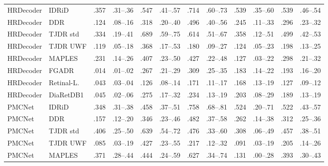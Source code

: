 \begin{landscape}
{\begin{longtable}{l l c c c c c c c c c c}
HRDecoder & IDRiD & .357 & \scriptsize .31--.36 & .547 & \scriptsize .41--.57 & .714 & \scriptsize .60--.73 & .539 & \scriptsize .35--.60 & .539 & \scriptsize .46--.54 \\
HRDecoder & DDR & .124 & \scriptsize .08--.16 & .318 & \scriptsize .20--.40 & .496 & \scriptsize .40--.56 & .245 & \scriptsize .11--.33 & .296 & \scriptsize .23--.32 \\
HRDecoder & TJDR std & .334 & \scriptsize .19--.41 & .689 & \scriptsize .59--.75 & .614 & \scriptsize .51--.67 & .358 & \scriptsize .12--.51 & .499 & \scriptsize .42--.53 \\
HRDecoder & TJDR UWF & .119 & \scriptsize .05--.18 & .368 & \scriptsize .17--.53 & .180 & \scriptsize .09--.27 & .124 & \scriptsize .05--.23 & .198 & \scriptsize .13--.25 \\
HRDecoder & MAPLES & .231 & \scriptsize .14--.26 & .407 & \scriptsize .23--.50 & .427 & \scriptsize .22--.48 & .127 & \scriptsize .03--.22 & .298 & \scriptsize .21--.32 \\
HRDecoder & FGADR & .014 & \scriptsize .01--.02 & .267 & \scriptsize .21--.29 & .309 & \scriptsize .25--.35 & .183 & \scriptsize .14--.22 & .193 & \scriptsize .16--.20 \\
HRDecoder & Retinal-L. & .043 & \scriptsize .03--.04 & .126 & \scriptsize .08--.14 & .171 & \scriptsize .11--.17 & .168 & \scriptsize .13--.19 & .127 & \scriptsize .09--.12 \\
HRDecoder & DiaRetDB1 & .045 & \scriptsize .02--.06 & .275 & \scriptsize .17--.32 & .234 & \scriptsize .13--.19 & .203 & \scriptsize .08--.29 & .189 & \scriptsize .13--.19 \\
PMCNet & IDRiD & .348 & \scriptsize .31--.38 & .458 & \scriptsize .37--.51 & .758 & \scriptsize .68--.81 & .524 & \scriptsize .20--.71 & .522 & \scriptsize .43--.57 \\
PMCNet & DDR & .157 & \scriptsize .12--.20 & .346 & \scriptsize .23--.46 & .482 & \scriptsize .37--.58 & .262 & \scriptsize .14--.38 & .312 & \scriptsize .25--.36 \\
PMCNet & TJDR std & .406 & \scriptsize .25--.50 & .639 & \scriptsize .54--.72 & .476 & \scriptsize .33--.60 & .308 & \scriptsize .06--.49 & .457 & \scriptsize .38--.51 \\
PMCNet & TJDR UWF & .085 & \scriptsize .03--.19 & .427 & \scriptsize .23--.55 & .217 & \scriptsize .12--.32 & .091 & \scriptsize .03--.19 & .205 & \scriptsize .14--.26 \\
PMCNet & MAPLES & .371 & \scriptsize .28--.44 & .444 & \scriptsize .24--.59 & .627 & \scriptsize .34--.74 & .131 & \scriptsize .00--.28 & .393 & \scriptsize .30--.43 \\

\end{longtable}}
\end{landscape}
